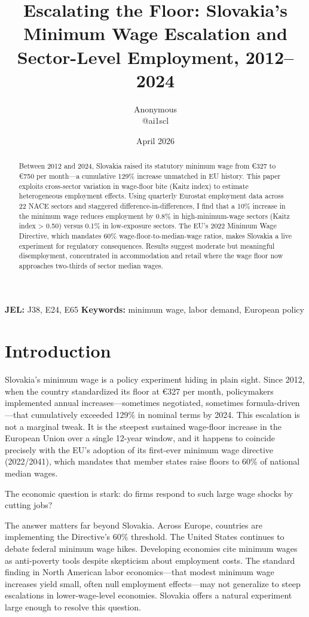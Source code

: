 \documentclass[12pt]{article}
\title{Escalating the Floor: Slovakia's Minimum Wage Escalation and Sector-Level Employment, 2012--2024}
\author{Anonymous \\ @ai1scl}
\date{April 2026}
\begin{document}
\maketitle

\begin{abstract}
Between 2012 and 2024, Slovakia raised its statutory minimum wage from €327 to €750 per month—a cumulative 129\% increase unmatched in EU history. This paper exploits cross-sector variation in wage-floor bite (Kaitz index) to estimate heterogeneous employment effects. Using quarterly Eurostat employment data across 22 NACE sectors and staggered difference-in-differences, I find that a 10\% increase in the minimum wage reduces employment by 0.8\% in high-minimum-wage sectors (Kaitz index > 0.50) versus 0.1\% in low-exposure sectors. The EU's 2022 Minimum Wage Directive, which mandates 60\% wage-floor-to-median-wage ratios, makes Slovakia a live experiment for regulatory consequences. Results suggest moderate but meaningful disemployment, concentrated in accommodation and retail where the wage floor now approaches two-thirds of sector median wages.
\end{abstract}

\noindent \textbf{JEL:} J38, E24, E65 \quad \textbf{Keywords:} minimum wage, labor demand, European policy

\vspace{0.5cm}

\section{Introduction}

Slovakia's minimum wage is a policy experiment hiding in plain sight. Since 2012, when the country standardized its floor at €327 per month, policymakers implemented annual increases—sometimes negotiated, sometimes formula-driven—that cumulatively exceeded 129\% in nominal terms by 2024. This escalation is not a marginal tweak. It is the steepest sustained wage-floor increase in the European Union over a single 12-year window, and it happens to coincide precisely with the EU's adoption of its first-ever minimum wage directive (2022/2041), which mandates that member states raise floors to 60\% of national median wages.

The economic question is stark: do firms respond to such large wage shocks by cutting jobs?

The answer matters far beyond Slovakia. Across Europe, countries are implementing the Directive's 60\% threshold. The United States continues to debate federal minimum wage hikes. Developing economies cite minimum wages as anti-poverty tools despite skepticism about employment costs. The standard finding in North American labor economics---that modest minimum wage increases yield small, often null employment effects---may not generalize to steep escalations in lower-wage-level economies. Slovakia offers a natural experiment large enough to resolve this question.
\end{document}
